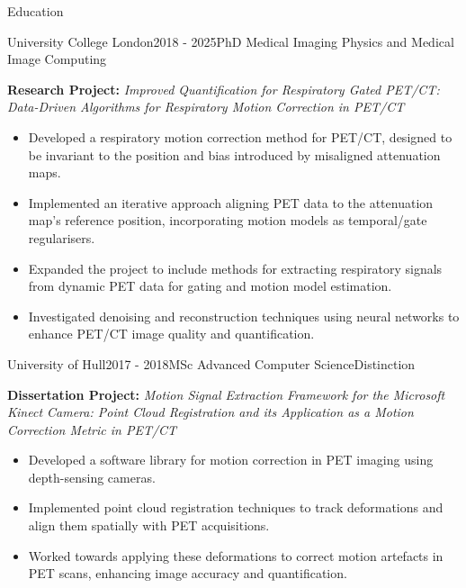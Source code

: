 \documentclass{cv}
\begin{document}
    \begin{rSection}{Education}
        \item \begin{rSubsection}{University College London}{2018 - 2025}{PhD Medical Imaging Physics and Medical Image Computing}{}            
            \item \textbf{Research Project:} \textit{Improved Quantification for Respiratory Gated PET/CT: Data-Driven Algorithms for Respiratory Motion Correction in PET/CT}
            
            \item \begin{itemize}
                \item Developed a respiratory motion correction method for PET/CT, designed to be invariant to the position and bias introduced by misaligned attenuation maps.
                \item Implemented an iterative approach aligning PET data to the attenuation map’s reference position, incorporating motion models as temporal/gate regularisers.
                \item Expanded the project to include methods for extracting respiratory signals from dynamic PET data for gating and motion model estimation.
                \item Investigated denoising and reconstruction techniques using neural networks to enhance PET/CT image quality and quantification.
            \end{itemize}
        \end{rSubsection}
        
        \item \begin{rSubsection}{University of Hull}{2017 - 2018}{MSc Advanced Computer Science}{Distinction}
            \item \textbf{Dissertation Project:} \textit{Motion Signal Extraction Framework for the Microsoft Kinect Camera: Point Cloud Registration and its Application as a Motion Correction Metric in PET/CT}
            
            \item \begin{itemize}
                \item Developed a software library for motion correction in PET imaging using depth-sensing cameras.
                \item Implemented point cloud registration techniques to track deformations and align them spatially with PET acquisitions.
                \item Worked towards applying these deformations to correct motion artefacts in PET scans, enhancing image accuracy and quantification.
            \end{itemize}
        \end{rSubsection}
        

\end{rSection}
\end{document}
